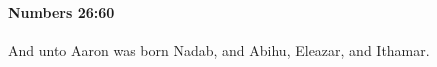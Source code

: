 
		\paragraph{Numbers 26:60} %
			\label{NUMBERS-26-60}

			And unto Aaron was born Nadab, and Abihu, Eleazar, and Ithamar.


